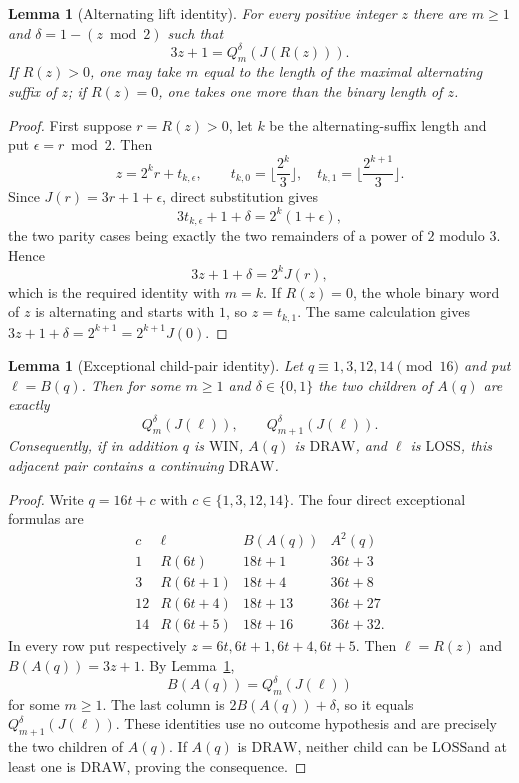 \documentclass[11pt]{article}
\newtheorem{lemma}[theorem]{Lemma}
\newcommand{\WIN}{\ensuremath{\mathrm{WIN}}}
\newcommand{\LOSS}{\ensuremath{\mathrm{LOSS}}}
\newcommand{\DRAW}{\ensuremath{\mathrm{DRAW}}}
\begin{document}
\begin{lemma}[Alternating lift identity]\label{lem:alt-lift}
For every positive integer $z$ there are $m\ge1$ and
$\delta=1-(z\bmod2)$ such that
\[
  3z+1=Q_m^\delta(J(R(z))).
\]
If $R(z)>0$, one may take $m$ equal to the length of the maximal alternating
suffix of $z$; if $R(z)=0$, one takes one more than the binary length of $z$.
\end{lemma}

\begin{proof}
First suppose $r=R(z)>0$, let $k$ be the alternating-suffix length and put
$\epsilon=r\bmod2$. Then
\[
 z=2^k r+t_{k,\epsilon},\qquad
 t_{k,0}=\Big\lfloor\frac{2^k}{3}\Big\rfloor,
 \quad t_{k,1}=\Big\lfloor\frac{2^{k+1}}{3}\Big\rfloor.
\]
Since $J(r)=3r+1+\epsilon$, direct substitution gives
\[
 3t_{k,\epsilon}+1+\delta=2^k(1+\epsilon),
\]
the two parity cases being exactly the two remainders of a power of $2$
modulo $3$. Hence
\[
 3z+1+\delta=2^kJ(r),
\]
which is the required identity with $m=k$. If $R(z)=0$, the whole binary word
of $z$ is alternating and starts with $1$, so
$z=t_{k,1}$. The same calculation gives
$3z+1+\delta=2^{k+1}=2^{k+1}J(0)$.
\end{proof}

\begin{lemma}[Exceptional child-pair identity]\label{lem:exceptional-side}
Let $q\equiv1,3,12,14\pmod{16}$ and put $\ell=B(q)$.  Then for some
$m\ge1$ and $\delta\in\{0,1\}$ the two children of $A(q)$ are exactly
\[
  Q_m^\delta(J(\ell)),\qquad Q_{m+1}^\delta(J(\ell)).
\]
Consequently, if in addition $q$ is \WIN, $A(q)$ is \DRAW, and
$\ell$ is \LOSS, this adjacent pair contains a continuing \DRAW.
\end{lemma}

\begin{proof}
Write $q=16t+c$ with $c\in\{1,3,12,14\}$. The four direct exceptional
formulas are
\[
\begin{array}{c|c|c|c}
c&\ell&B(A(q))&A^2(q)\\ \hline
1&R(6t)&18t+1&36t+3\\
3&R(6t+1)&18t+4&36t+8\\
12&R(6t+4)&18t+13&36t+27\\
14&R(6t+5)&18t+16&36t+32.
\end{array}
\]
In every row put respectively $z=6t,6t+1,6t+4,6t+5$. Then
$\ell=R(z)$ and $B(A(q))=3z+1$. By Lemma~\ref{lem:alt-lift},
\[
  B(A(q))=Q_m^\delta(J(\ell))
\]
for some $m\ge1$. The last column is $2B(A(q))+\delta$, so it equals
$Q_{m+1}^\delta(J(\ell))$. These identities use no outcome hypothesis and
are precisely the two children of $A(q)$.  If $A(q)$ is \DRAW, neither
child can be \LOSS and at least one is \DRAW, proving the consequence.
\end{proof}
\end{document}
